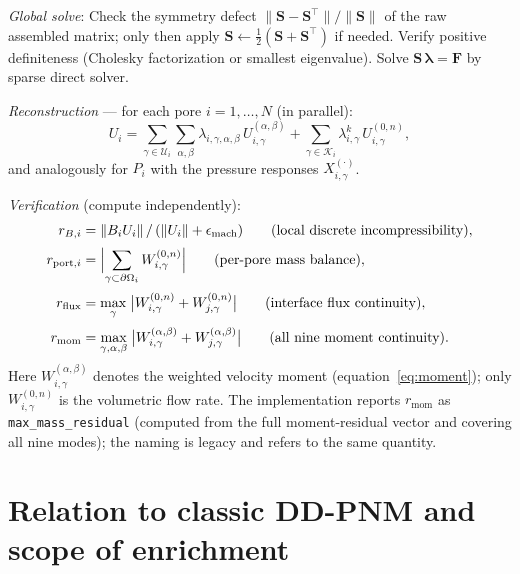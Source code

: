 \documentclass[11pt,a4paper]{article}
\newcommand{\pore}[1]{\Omega_{#1}}
\newcommand{\trac}{\bm{\lambda}}
\newcommand{\Schur}{\mathbf{S}}
\begin{document}
\begin{center}
{\begin{minipage}{0.92\textwidth}
\noindent\emph{Global solve}:
Check the symmetry defect $\|\Schur - \Schur^\top\| / \|\Schur\|$ of the
raw assembled matrix; only then apply $\Schur \leftarrow
\frac12(\Schur+\Schur^\top)$ if needed.  Verify positive definiteness
(Cholesky factorization or smallest eigenvalue).  Solve
$\Schur\,\trac = \bm{F}$ by sparse direct solver.

\noindent\emph{Reconstruction} --- for each pore $i=1,\dots,N$ (in parallel):
\[
  \textstyle
  U_i = \sum_{\gamma\in\mathcal{U}_i}\sum_{\alpha,\beta}
    \lambda_{i,\gamma,\alpha,\beta}\,U_{i,\gamma}^{(\alpha,\beta)}
    + \sum_{\gamma\in\mathcal{K}_i} \lambda_{i,\gamma}^k\,
    U_{i,\gamma}^{(0,n)},
\]
and analogously for $P_i$ with the pressure responses $X_{i,\gamma}^{(\cdot)}$.

\noindent\emph{Verification} (compute independently):
\begin{align*}
  r_{B,i} &= \|B_i U_i\| \,/\, (\|U_i\| + \epsilon_{\text{mach}})
    \qquad \text{(local discrete incompressibility)}, \\[2pt]
  r_{\text{port},i} &= \Bigl|\sum_{\gamma\subset\partial\pore{i}}
    W_{i,\gamma}^{(0,n)}\Bigr|
    \qquad \text{(per-pore mass balance)}, \\[2pt]
  r_{\text{flux}} &= \max_{\gamma}\; \bigl|
    W_{i,\gamma}^{(0,n)} + W_{j,\gamma}^{(0,n)}\bigr|
    \qquad \text{(interface flux continuity)}, \\[2pt]
  r_{\text{mom}} &= \max_{\gamma,\alpha,\beta}\; \bigl|
    W_{i,\gamma}^{(\alpha,\beta)} + W_{j,\gamma}^{(\alpha,\beta)}\bigr|
    \qquad \text{(all nine moment continuity)}.
\end{align*}
Here $W_{i,\gamma}^{(\alpha,\beta)}$ denotes the weighted velocity moment
(equation~\eqref{eq:moment}); only $W_{i,\gamma}^{(0,n)}$ is the
volumetric flow rate.  The implementation reports
$r_{\text{mom}}$ as \texttt{max\_mass\_residual} (computed from the full
moment-residual vector and covering all nine modes); the naming is
legacy and refers to the same quantity.
\smallskip
\end{minipage}}
\end{center}

\section{Relation to classic DD-PNM and scope of enrichment}
\end{document}
